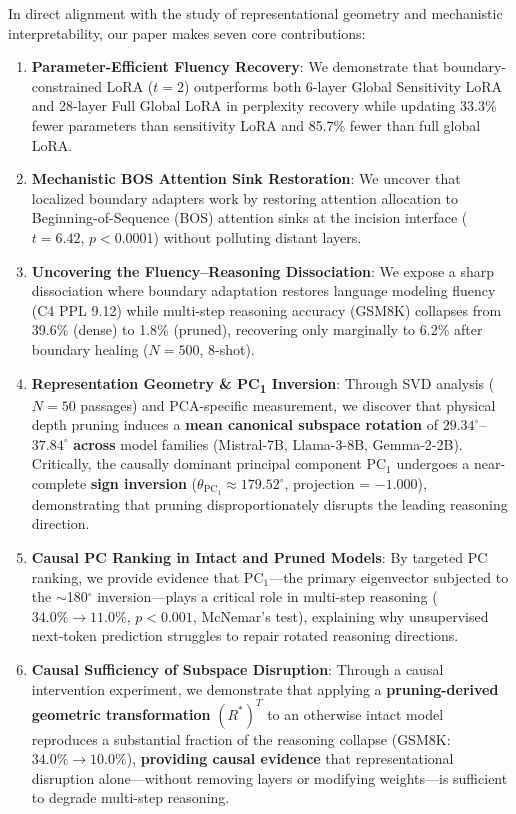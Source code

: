 \documentclass[11pt]{article}
\begin{document}
In direct alignment with the study of representational geometry and mechanistic interpretability, our paper makes seven core contributions:
\begin{enumerate}
    \item \textbf{Parameter-Efficient Fluency Recovery}: We demonstrate that boundary-constrained LoRA ($t=2$) outperforms both 6-layer Global Sensitivity LoRA and 28-layer Full Global LoRA in perplexity recovery while updating 33.3\% fewer parameters than sensitivity LoRA and 85.7\% fewer than full global LoRA.
    \item \textbf{Mechanistic BOS Attention Sink Restoration}: We uncover that localized boundary adapters work by restoring attention allocation to Beginning-of-Sequence (BOS) attention sinks \citep{xiao2023efficient} at the incision interface ($t=6.42$, $p < 0.0001$) without polluting distant layers.
    \item \textbf{Uncovering the Fluency--Reasoning Dissociation}: We expose a sharp dissociation where boundary adaptation restores language modeling fluency (C4 PPL 9.12) while multi-step reasoning accuracy (GSM8K) collapses from 39.6\% (dense) to 1.8\% (pruned), recovering only marginally to 6.2\% after boundary healing ($N=500$, 8-shot).
    \item \textbf{Representation Geometry \& PC\textsubscript{1} Inversion}: Through SVD analysis ($N=50$ passages) and PCA-specific measurement, we discover that physical depth pruning induces a \textbf{mean canonical subspace rotation} of $29.34^\circ$--$37.84^\circ$ \textbf{across} model families (Mistral-7B, Llama-3-8B, Gemma-2-2B). Critically, the causally dominant principal component $\mathrm{PC}_1$ undergoes a near-complete \textbf{sign inversion} ($\theta_{\mathrm{PC}_1} \approx 179.52^\circ$, projection = $-1.000$), demonstrating that pruning disproportionately disrupts the leading reasoning direction.
    \item \textbf{Causal PC Ranking in Intact and Pruned Models}: By targeted PC ranking, we provide evidence that $\mathrm{PC}_1$---the primary eigenvector subjected to the $\sim$180$^\circ$ inversion---plays a critical role in multi-step reasoning ($34.0\% \!\to\! 11.0\%$, $p < 0.001$, McNemar's test), explaining why unsupervised next-token prediction struggles to repair rotated reasoning directions.
    \item \textbf{Causal Sufficiency of Subspace Disruption}: Through a causal intervention experiment, we demonstrate that applying a \textbf{pruning-derived geometric transformation} $(R^*)^T$ to an otherwise intact model reproduces a substantial fraction of the reasoning collapse (GSM8K: $34.0\% \!\to\! 10.0\%$), \textbf{providing causal evidence} that representational disruption alone---without removing layers or modifying weights---is sufficient to degrade multi-step reasoning.

\end{enumerate}
\end{document}
